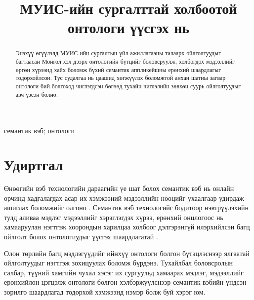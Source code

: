 \documentclass[conference, a4paper, mongolian]{myIEEEtran}
\begin{document}
\renewcommand{\abstractname}{Хураангуй}

\title {МУИС-ийн сургалттай холбоотой \\ онтологи үүсгэх нь}

\author{
	\and
}

\maketitle
\thispagestyle{plain}
\pagestyle{plain}

\begin{abstract}
Энэхүү өгүүлэлд МУИС-ийн сургалтын үйл ажиллагааны талаарх ойлголтуудыг багтаасан Монгол хэл дээрх онтологийн бүтцийг боловсруулж,  холбогдох мэдээллийг өргөн хүрээнд хайх боломж бүхий семантик аппликейшны ерөнхий шаардлагыг тодорхойлсон. Тус судалгаа нь цаашид хөгжүүлэх боломжтой анхан шатны загвар онтологи бий болгоход чиглэгдсэн бөгөөд тухайн чиглэлийн зөвхөн суурь ойлголтуудыг авч үзсэн болно.\\
\end{abstract}

\begin{IEEEkeywords}
семантик вэб; онтологи
\end{IEEEkeywords}
%
\section{Удиртгал}
%
Өнөөгийн вэб технологийн дараагийн үе шат болох семантик вэб нь онлайн орчинд хадгалагдах асар их хэмжээний мэдээллийн нөөцийг ухаалгаар удирдаж ашиглах боломжийг олгоно \cite{bib:1}. Семантик вэб технологийг бодитоор нэвтрүүлэхийн тулд аливаа мэдлэг мэдээллийг хэрэглэгдэх хүрээ, ерөнхий онцлогоос нь хамааруулан нэгтгэж хоорондын харилцаа холбоог дэлгэрэнгүй илэрхийлсэн багц ойлголт болох онтологиудыг үүсгэх шаардлагатай \cite{bib:2}.

Олон төрлийн багц мэдлэгүүдийг ийнхүү онтологи болгон бүтэцлэснээр ялгаатай ойлголтуудыг нэгтгэж зохицуулах боломж бүрдэнэ. Тухайлбал боловсролын салбар, түүний хамгийн чухал хэсэг их сургуульд хамаарах мэдлэг, мэдээллийг ерөнхийлөн цэгцэлж онтологи болгон хэлбэржүүлснээр семантик вэбийн үндсэн зорилго шаардлагад тодорхой хэмжээнд нэмэр болж буй хэрэг юм.
\end{document}
